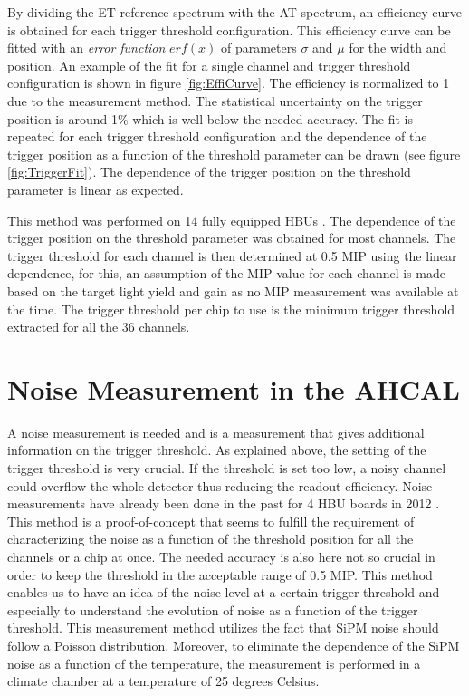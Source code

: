 By dividing the ET reference spectrum with the AT spectrum, an efficiency curve is obtained for each trigger threshold configuration. This efficiency curve can be fitted with an \textit{error function} $erf(x)$ of parameters $\sigma$ and $\mu$ for the width and position. An example of the fit for a single channel and trigger threshold configuration is shown in figure \ref{fig:EffiCurve}. The efficiency is normalized to 1 due to the measurement method. The statistical uncertainty on the trigger position is around 1\% which is well below the needed accuracy. The fit is repeated for each trigger threshold configuration and the dependence of the trigger position as a function of the threshold parameter can be drawn (see figure \ref{fig:TriggerFit}). The dependence of the trigger position on the threshold parameter is linear as expected.

This method was performed on 14 fully equipped HBUs \cite{LloydTrigger}. The dependence of the trigger position on the threshold parameter was obtained for most channels. The trigger threshold for each channel is then determined at 0.5 MIP using the linear dependence, for this, an assumption of the MIP value for each channel is made based on the target light yield and gain as no MIP measurement was available at the time. The trigger threshold per chip to use is the minimum trigger threshold extracted for all the 36 channels.

\section{Noise Measurement in the AHCAL}

A noise measurement is needed and is a measurement that gives additional information on the trigger threshold. As explained above, the setting of the trigger threshold is very crucial. If the threshold is set too low, a noisy channel could overflow the whole detector thus reducing the readout efficiency. Noise measurements have already been done in the past for 4 HBU boards in 2012 \cite{Hermberg:2015gaa}. This method is a proof-of-concept that seems to fulfill the requirement of characterizing the noise as a function of the threshold position for all the channels or a chip at once. The needed accuracy is also here not so crucial in order to keep the threshold in the acceptable range of 0.5 MIP. This method enables us to have an idea of the noise level at a certain trigger threshold and especially to understand the evolution of noise as a function of the trigger threshold. This measurement method utilizes the fact that SiPM noise should follow a Poisson distribution. Moreover, to eliminate the dependence of the SiPM noise as a function of the temperature, the measurement is performed in a climate chamber at a temperature of 25 degrees Celsius.

